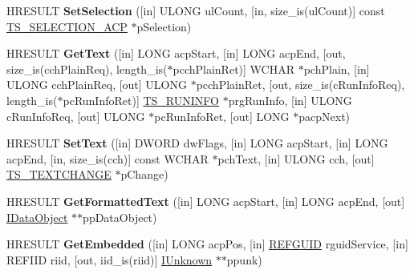 \begin{DoxyCompactItemize}
\item 
\mbox{\label{interface_i_text_store_a_c_p_a176aba280cf12f10192cefc2204c02f8}} 
H\+R\+E\+S\+U\+LT {\bfseries Set\+Selection} (\mbox{[}in\mbox{]} U\+L\+O\+NG ul\+Count, \mbox{[}in, size\+\_\+is(ul\+Count)\mbox{]} const \hyperlink{struct_t_s___s_e_l_e_c_t_i_o_n___a_c_p}{T\+S\+\_\+\+S\+E\+L\+E\+C\+T\+I\+O\+N\+\_\+\+A\+CP} $\ast$p\+Selection)
\item 
\mbox{\label{interface_i_text_store_a_c_p_a5d4f1f3802daad8f99cd5867a656f36f}} 
H\+R\+E\+S\+U\+LT {\bfseries Get\+Text} (\mbox{[}in\mbox{]} L\+O\+NG acp\+Start, \mbox{[}in\mbox{]} L\+O\+NG acp\+End, \mbox{[}out, size\+\_\+is(cch\+Plain\+Req), length\+\_\+is($\ast$pcch\+Plain\+Ret)\mbox{]} W\+C\+H\+AR $\ast$pch\+Plain, \mbox{[}in\mbox{]} U\+L\+O\+NG cch\+Plain\+Req, \mbox{[}out\mbox{]} U\+L\+O\+NG $\ast$pcch\+Plain\+Ret, \mbox{[}out, size\+\_\+is(c\+Run\+Info\+Req), length\+\_\+is($\ast$pc\+Run\+Info\+Ret)\mbox{]} \hyperlink{struct_t_s___r_u_n_i_n_f_o}{T\+S\+\_\+\+R\+U\+N\+I\+N\+FO} $\ast$prg\+Run\+Info, \mbox{[}in\mbox{]} U\+L\+O\+NG c\+Run\+Info\+Req, \mbox{[}out\mbox{]} U\+L\+O\+NG $\ast$pc\+Run\+Info\+Ret, \mbox{[}out\mbox{]} L\+O\+NG $\ast$pacp\+Next)
\item 
\mbox{\label{interface_i_text_store_a_c_p_aefb56a7b132f3ea46e9c41496c166457}} 
H\+R\+E\+S\+U\+LT {\bfseries Set\+Text} (\mbox{[}in\mbox{]} D\+W\+O\+RD dw\+Flags, \mbox{[}in\mbox{]} L\+O\+NG acp\+Start, \mbox{[}in\mbox{]} L\+O\+NG acp\+End, \mbox{[}in, size\+\_\+is(cch)\mbox{]} const W\+C\+H\+AR $\ast$pch\+Text, \mbox{[}in\mbox{]} U\+L\+O\+NG cch, \mbox{[}out\mbox{]} \hyperlink{struct_t_s___t_e_x_t_c_h_a_n_g_e}{T\+S\+\_\+\+T\+E\+X\+T\+C\+H\+A\+N\+GE} $\ast$p\+Change)
\item 
\mbox{\label{interface_i_text_store_a_c_p_a1e06c4fb6873601b420c120e57630702}} 
H\+R\+E\+S\+U\+LT {\bfseries Get\+Formatted\+Text} (\mbox{[}in\mbox{]} L\+O\+NG acp\+Start, \mbox{[}in\mbox{]} L\+O\+NG acp\+End, \mbox{[}out\mbox{]} \hyperlink{interface_i_data_object}{I\+Data\+Object} $\ast$$\ast$pp\+Data\+Object)
\item 
\mbox{\label{interface_i_text_store_a_c_p_a34865ae23abc2fda3e8b20b31766bc86}} 
H\+R\+E\+S\+U\+LT {\bfseries Get\+Embedded} (\mbox{[}in\mbox{]} L\+O\+NG acp\+Pos, \mbox{[}in\mbox{]} \hyperlink{struct___g_u_i_d}{R\+E\+F\+G\+U\+ID} rguid\+Service, \mbox{[}in\mbox{]} R\+E\+F\+I\+ID riid, \mbox{[}out, iid\+\_\+is(riid)\mbox{]} \hyperlink{interface_i_unknown}{I\+Unknown} $\ast$$\ast$ppunk)

\end{DoxyCompactItemize}
